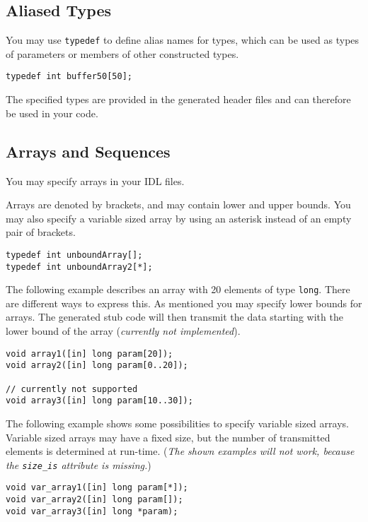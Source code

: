 \subsection{Aliased Types}
You may use {\tt typedef} to define alias names for types, which
can be used as types of parameters or members of other constructed 
types.

\begin{verbatim}
typedef int buffer50[50];
\end{verbatim}

The specified types are provided in the generated header files and
can therefore be used in your code.

\subsection{Arrays and Sequences}
You may specify arrays in your IDL files.

Arrays are denoted by brackets, and may contain lower and upper bounds.
You may also specify a variable sized array by using an asterisk instead
of an empty pair of brackets.

\begin{verbatim}
typedef int unboundArray[];
typedef int unboundArray2[*];
\end{verbatim}

The following example describes an array with 20 elements of type \verb|long|.
There are different ways to express this. As mentioned you may specify 
lower bounds for arrays. The generated stub code will then transmit
the data starting with the lower bound of the array ({\em currently
not implemented}). 

\begin{verbatim}
void array1([in] long param[20]);
void array2([in] long param[0..20]);

// currently not supported
void array3([in] long param[10..30]);
\end{verbatim}

The following example shows some possibilities to specify variable
sized arrays. Variable sized arrays may have a fixed size, but the 
number of transmitted elements is determined at run-time. ({\em The
shown examples will not work, because the \verb|size_is| attribute
is missing.})

\begin{verbatim}
void var_array1([in] long param[*]);
void var_array2([in] long param[]);
void var_array3([in] long *param);
\end{verbatim}

